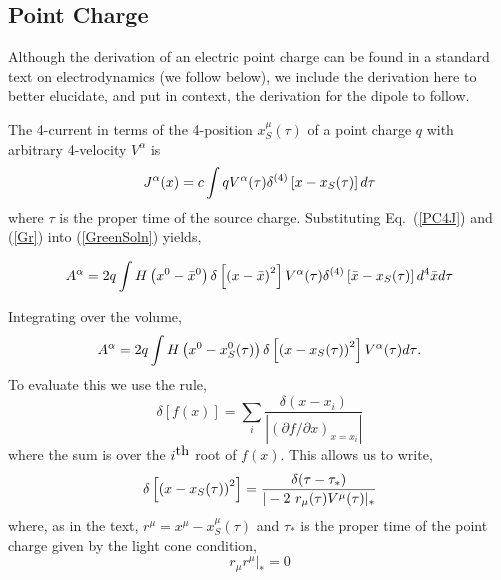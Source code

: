 \subsection{Point Charge}
Although the derivation of an electric point charge can be found in a standard text on electrodynamics (we follow \cite{Jackson} below), we include the derivation here to better elucidate, and put in context, the derivation for the dipole to follow.

The 4-current in terms of the 4-position $x^{\mu}_S(\tau)$ of a point charge $q$ with arbitrary 4-velocity $V^{\alpha}$ is
\begin{equation}
J^{\alpha}({x}) = c \int {q V^{\alpha}(\tau) \delta^{(4)}\left[ {x} -{x_S}(\tau) \right]  d \tau}
\label{PC4J}
\end{equation}
where $\tau$ is the proper time of the source charge. Substituting Eq.\  (\ref{PC4J}) and (\ref{Gr}) into (\ref{GreenSoln}) yields,
\begin{widetext}
\begin{align}
A^{\alpha}  = 2q \int{ H \left( x^0  -  \bar{x}^0 \right)  \delta \left[ \left( {x} -{\bar{x}}\right)^2 \right]  V^{\alpha}(\tau) \delta^{(4)}\left[ {\bar{x}} -{x_S}(\tau) \right]  d^4\bar{{x}} d \tau}
\label{PCA1}
\end{align}
\end{widetext}
Integrating over the volume,
\begin{align}
A^{\alpha} =2q \int{ H \left( x^0  -  x^0_S(\tau) \right) \delta \left[ \left({x} -{x_S}(\tau)\right)^2 \right]  V^{\alpha}(\tau)    d \tau}.
\label{PCA2}
\end{align}
To evaluate this we use the rule,
\begin{equation}
\delta \left[ f(x) \right] = \sum_i{\frac{\delta(x-x_i)}{| \left( \partial f / \partial x \right)_{x=x_i}|}}
\label{DelFofx}
\end{equation}
where the sum is over the $i^{\hbox{th}}$ root of $f(x)$. This allows us to write, 
\begin{equation}
\delta \left[  \left({x} -{x_S}(\tau) \right)^2 \right] =  \frac{ \delta(\tau-\tau_*) }{ | -2 \ r_{\mu}(\tau) V^{\mu}(\tau)|_{*} }
\label{delf2}
\end{equation}
where, as in the text, $r^{\mu}  = x^{\mu} - x^{\mu}_S(\tau)$ and $\tau_*$ is the proper time of the point charge given by the light cone condition,
\begin{equation}
r_{\mu} r^{\mu}|_* =0
\end{equation}


